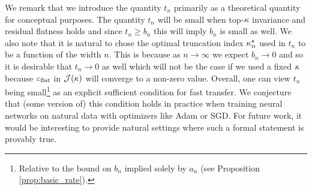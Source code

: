 We remark that we introduce the quantity $t_n$ primarily as a theoretical quantity for conceptual purposes. The quantity $t_n$ will be small when top-$\kappa$ invariance and residual flatness holds and since $t_n \geq b_n$ this will imply $b_n$ is small as well. We also note that it is natural to chose the optimal truncation index $\kappa^\star_n$ used in $t_n$ to be a function of the width $n$. This is because as $n \to \infty$ we expect $b_n \to 0$ and so it is desirable that $t_n \to 0$ as well which will not be the case if we used a fixed $\kappa$ because $\varepsilon_{\mathrm{flat}}$ in $\mathcal{J}(\kappa)$ will converge to a non-zero value. Overall, one can view $t_n$ being small\footnote{Relative to the bound on $b_n$ implied solely by $a_n$ (see Proposition \ref{prop:basic_rate}).} as an explicit sufficient condition for fast transfer. We conjecture that (some version of) this condition holds in practice when training neural networks on natural data with optimizers like Adam or SGD. For future work, it would be interesting to provide natural settings where such a formal statement is provably true.


